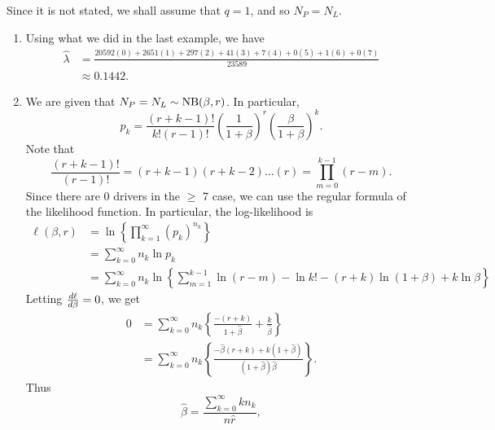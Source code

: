 \documentclass[notoc,notitlepage]{tufte-book}
\begin{document}
\begin{solution}
  Since it is not stated, we shall assume that $q = 1$,
  and so $N_P = N_L$.
  \begin{enumerate}
    \item Using what we did in the last example, we have
      \begin{align*}
        \hat{\lambda} &= \frac{20592(0) + 2651(1) + 297(2) + 41(3) + 7(4)
          + 0(5) + 1(6) + 0(7)}{23589} \\
                      &\approx 0.1442.
      \end{align*}

    \item We are given that $N_P = N_L \sim \operatorname{NB}(\beta, r)$. In particular,
      \begin{equation*}
        p_k = \frac{(r+k-1)!}{k!(r-1)!} \left( \frac{1}{1 + \beta} \right)^r
        \left( \frac{\beta}{1 + \beta} \right)^k.
      \end{equation*}
      Note that
      \begin{equation*}
        \frac{(r+k-1)!}{(r-1)!} = (r+k-1)(r+k-2)\hdots(r)
          = \prod_{m=0}^{k-1} (r-m).
      \end{equation*}
      Since there are 0 drivers in the $\geq$ 7 case, we can use the
      regular formula of the likelihood function.
      In particular, the log-likelihood is
      \begin{align*}
        \ell(\beta, r)
        &= \ln \left\{ \prod_{k=1}^{\infty} (p_k)^{n_k} \right\} \\
        &= \sum_{k=0}^{\infty} n_k \ln p_k \\
        &= \sum_{k=0}^{\infty} n_k \ln \left\{ 
          \sum_{m=1}^{k-1} \ln (r-m) - \ln k!
          - (r+k) \ln (1 + \beta) + k \ln \beta
        \right\}
      \end{align*}
      Letting $\frac{\mathop{}\!d{\ell}}{\mathop{}\!d{\beta}} = 0$, we get
      \begin{align*}
        0 &= \sum_{k=0}^{\infty} n_k \left\{ \frac{-(r+k)}{1+\hat{\beta}} +
            \frac{k}{\hat{\beta}} \right\} \\
          &= \sum_{k=0}^{\infty} n_k \left\{ \frac{-\hat{\beta}(r+k) 
            + k(1 + \hat{\beta})}{(1 + \hat{\beta}) \hat{\beta}} \right\}.
      \end{align*}
      Thus
      \begin{equation*}
        \hat{\beta} = \frac{ \sum_{k=0}^{\infty} kn_k }{n \hat{r}},
      \end{equation*}

\end{enumerate}
\end{solution}
\end{document}
